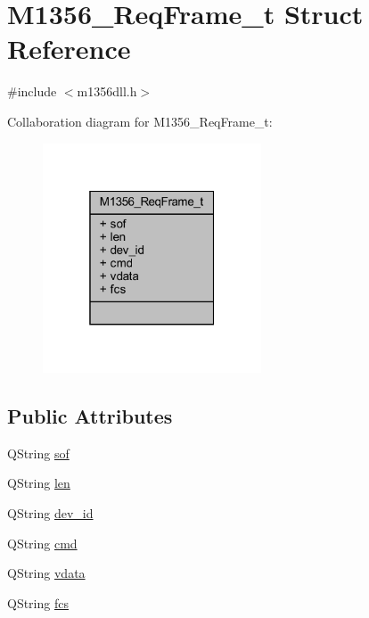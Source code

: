 \hypertarget{struct_m1356___req_frame__t}{}\section{M1356\+\_\+\+Req\+Frame\+\_\+t Struct Reference}
\label{struct_m1356___req_frame__t}


{\ttfamily \#include $<$m1356dll.\+h$>$}



Collaboration diagram for M1356\+\_\+\+Req\+Frame\+\_\+t\+:
\nopagebreak
\begin{figure}[H]
\begin{center}
\leavevmode
\includegraphics[width=184pt]{struct_m1356___req_frame__t__coll__graph}
\end{center}
\end{figure}
\subsection*{Public Attributes}
\begin{DoxyCompactItemize}
\item 
Q\+String \mbox{\hyperlink{struct_m1356___req_frame__t_a715b08f85ea36a3068f0508c2da869c9}{sof}}
\item 
Q\+String \mbox{\hyperlink{struct_m1356___req_frame__t_a8f1079624d94a8dffa53a741fce6a124}{len}}
\item 
Q\+String \mbox{\hyperlink{struct_m1356___req_frame__t_aa531579caee64e843b085ee3d2efbe2f}{dev\+\_\+id}}
\item 
Q\+String \mbox{\hyperlink{struct_m1356___req_frame__t_a60ee2d57c068e5b4e275e6a2d76b2177}{cmd}}
\item 
Q\+String \mbox{\hyperlink{struct_m1356___req_frame__t_afdc84411b144531c4f7270f323fd9e40}{vdata}}
\item 
Q\+String \mbox{\hyperlink{struct_m1356___req_frame__t_aee257c4e782fb78f8825bb7cba34f742}{fcs}}
\end{DoxyCompactItemize}


